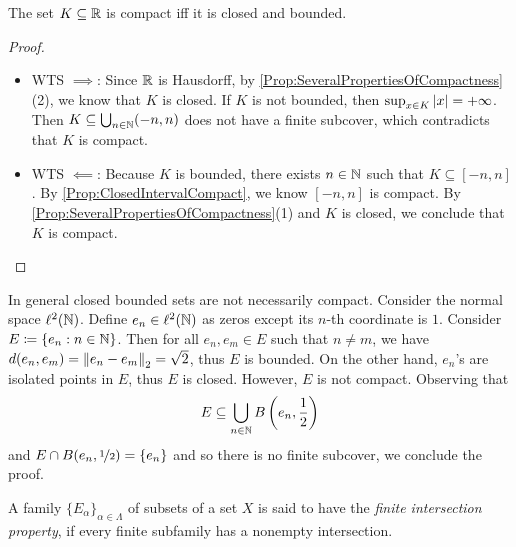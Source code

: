 \documentclass[screen]{techreport}
\numberwithin{equation}{section}
\begin{document}
\begin{theorem}\label{The:HeineBorelProperty}
	The set $K \subseteq \mathbb{R}$ is compact iff it is closed and bounded.
\end{theorem}
\begin{proof}\
	\begin{itemize}
		\item WTS ${\implies}$: Since $\mathbb{R}$ is Hausdorff, by \cref{Prop:SeveralPropertiesOfCompactness}(2), we know that $K$ is closed.
		If $K$ is not bounded, then $\sup_{x \in K} \left|{x}\right| = +\infty$.
		Then $K \subseteq \bigcup_{n \in \mathbb{N}} (-n,n)$ does not have a finite subcover, which contradicts that $K$ is compact.
		
		\item WTS ${\impliedby}$: Because $K$ is bounded, there exists $n \in \mathbb{N}$ such that $K \subseteq [-n,n]$.
		By \cref{Prop:ClosedIntervalCompact}, we know $[-n,n]$ is compact.
		By \cref{Prop:SeveralPropertiesOfCompactness}(1) and $K$ is closed, we conclude that $K$ is compact.
	\end{itemize}
\end{proof}

\begin{example}\label{Exa:ClosedBoundedNotCompact}
	In general closed bounded sets are not necessarily compact.
	Consider the normal space $\ell^2(\mathbb{N})$.
	Define $e_n \in \ell^2(\mathbb{N})$ as zeros except its $n$-th coordinate is $1$.
	Consider $E \coloneqq \left\{ {e_n : n \in \mathbb{N}} \right\}$.
	Then for all $e_n,e_m \in E$ such that $n\ne m$, we have $d(e_n,e_m) = \left\|{e_n - e_m}\right\|_2 = \sqrt{2}$, thus $E$ is bounded.
	On the other hand, $e_n$'s are isolated points in $E$, thus $E$ is closed.
	However, $E$ is not compact.
	Observing that
	\[
	E \subseteq \bigcup_{n \in \mathbb{N}} B\left({e_n, \frac{1}{2}}\right)
	\]
	and $E \cap B(e_n,\nicefrac{1}{2}) = \{ e_n \}$ and so there is no finite subcover,
	we conclude the proof.
\end{example}

\begin{definition}\label{De:FiniteIntersectionProperty}
	A family $\{E_\alpha\}_{\alpha \in \Lambda}$ of subsets of a set $X$ is said to have the \emph{finite intersection property}, if every finite subfamily has a nonempty intersection.
\end{definition}
\end{document}
